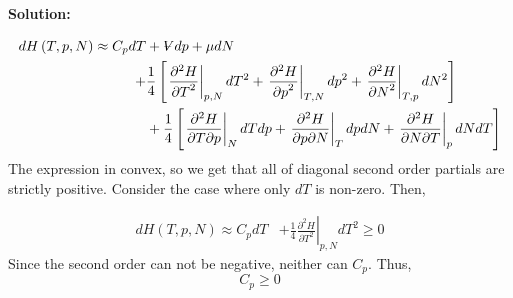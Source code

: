 \documentclass[10pt]{article}
\newenvironment{Solution}
    {\textbf{Solution:}
    
    \vspace{5mm}
    \begin{tcolorbox}
    }
    {
    \end{tcolorbox}
    \vspace{5mm}
    }
\newcommand{\vol}{{\ooalign{\hfil$V$\hfil\cr\kern0.08em--\hfil\cr}}}
\begin{document}
\begin{enumerate}
\begin{Solution}
\begin{align}
    dH\left(T,p,N\right) \approx C_p dT &+ \vol dp  + \mu dN \\+& \frac{1}{4}\left[\left.\frac{\partial^2 H}{{\partial T}^2}\right|_{p,N} dT^2 + \left.\frac{\partial^2 H}{{\partial p}^2}\right|_{T,N} dp^2  + \left.\frac{\partial^2 H}{{\partial N}^2}\right|_{T,p} dN^2\right]\\&+ \frac{1}{4}\left[\left.\frac{\partial^2 H}{{\partial T \partial p}}\right|_{N} dT dp + \left.\frac{\partial^2 H}{{\partial p \partial N}}\right|_{T} dp dN  + \left.\frac{\partial^2 H}{{\partial N \partial T}}\right|_{p} dN dT\right]
\end{align}
The expression in convex, so we get that all of diagonal second order partials are strictly positive. Consider the case where only $dT$ is non-zero. Then,

\begin{align}
    dH\left(T,p,N\right) \approx C_p dT &+  \frac{1}{4}\left.\frac{\partial^2 H}{{\partial T}^2}\right|_{p,N} dT^2 \geq 0
\end{align}
Since the second order can not be negative, neither can $C_p$. Thus,
\begin{equation}
    \boxed{C_p \geq 0}
\end{equation}


\end{Solution}




\end{enumerate}
\end{document}
